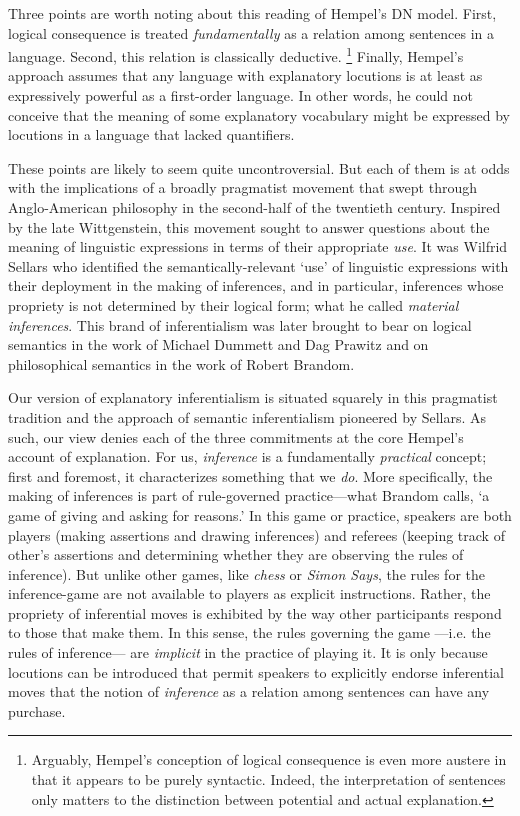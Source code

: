 \documentclass{article}
\begin{document}
Three points are worth noting about this reading of Hempel's DN model. First, logical consequence is treated \textit{fundamentally} as a relation among sentences in a language. Second, this relation is classically deductive. \footnote{Arguably, Hempel's conception of logical consequence is even more austere in that it appears to be purely syntactic. Indeed, the interpretation of sentences only matters to the distinction between potential and actual explanation.} Finally, Hempel's approach assumes that any language with explanatory locutions is at least as expressively powerful as a first-order language. In other words, he could not conceive that the meaning of some explanatory vocabulary might be expressed by locutions in a language that lacked quantifiers.

These points are likely to seem quite uncontroversial. But each of them is at odds with the implications of a broadly pragmatist movement that swept through Anglo-American philosophy in the second-half of the twentieth century. Inspired by the late Wittgenstein, this movement sought to answer questions about the meaning of linguistic expressions in terms of their appropriate \textit{use}. It was Wilfrid Sellars who identified the semantically-relevant `use' of linguistic expressions with their deployment in the making of inferences, and in particular, inferences whose propriety is not determined by their logical form; what he called \textit{material inferences}. This brand of inferentialism was later brought to bear on logical semantics in the work of Michael Dummett and Dag Prawitz and on philosophical semantics in the work of Robert Brandom.

Our version of explanatory inferentialism is situated squarely in this pragmatist tradition and the approach of semantic inferentialism pioneered by Sellars. As such, our view denies each of the three commitments at the core Hempel's account of explanation. For us, \textit{inference} is a fundamentally \textit{practical} concept; first and foremost, it characterizes something that we \textit{do}. More specifically, the making of inferences is part of rule-governed practice---what Brandom calls, `a game of giving and asking for reasons.' In this game or practice, speakers are both players (making assertions and drawing inferences) and referees (keeping track of other's assertions and determining whether they are observing the rules of inference). But unlike other games, like \textit{chess} or \textit{Simon Says}, the rules for the inference-game are not available to players as explicit instructions. Rather, the propriety of inferential moves is exhibited by the way other participants respond to those that make them. In this sense, the rules governing the game ---i.e. the rules of inference--- are \textit{implicit} in the practice of playing it. It is only because locutions can be introduced that permit speakers to explicitly endorse inferential moves that the notion of \textit{inference} as a relation among sentences can have any purchase.
\end{document}
